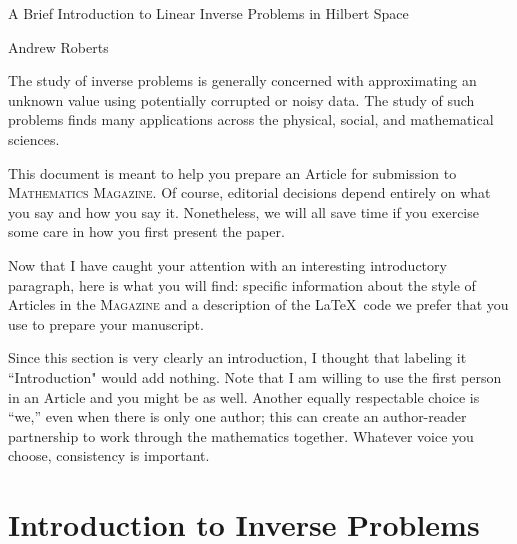 \documentclass[12pt]{article}
\begin{document}
\begin{center}
\Large
A Brief Introduction to Linear Inverse Problems in Hilbert Space
\end{center}

\begin{flushright}
Andrew Roberts
\end{flushright} 

The study of inverse problems is generally concerned with approximating 
an unknown value using potentially corrupted or noisy data. The study of 
such problems finds many applications across the physical, social, and 
mathematical sciences. 

This document is meant to help you prepare an Article for
submission to \textsc{Mathematics Magazine}.  Of course,
editorial decisions depend entirely on
what you say and how you say it. Nonetheless, we will all save
time if you exercise some care in how you first present the paper.

Now that I have caught your attention with an interesting introductory paragraph,
here is what you will find:
specific information about the style of Articles in the \textsc{Magazine}
and a description of the \LaTeX\ code we prefer that you use
to prepare your manuscript.

Since this section is very clearly
an introduction, I thought that labeling it ``Introduction" would add
nothing.  Note that I am willing to use the first person in an Article
and you might be as well.  Another equally respectable choice is ``we,''
even when there is only one author; this can
create an author-reader partnership to
work through the mathematics together.
Whatever voice you choose, consistency is important.

\section{Introduction to Inverse Problems} \label{inverse_problem_intro}
\end{document}
